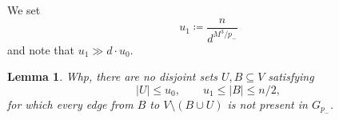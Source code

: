 \documentclass[notitlepage]{scrartcl}
\newtheorem{lemma}[thm]{Lemma}
\begin{document}


We set
\begin{equation*}
 u_1\coloneqq \frac{n}{d^{M^3/p_-}}
\end{equation*}
and note that $u_1 \gg d\cdot u_0$.


\begin{lemma}\label{lem:no-small-separator}
Whp, there are no disjoint sets $U, B\subseteq V$ satisfying
\[
 |U|\le u_0, \qquad u_1\le|B|\le n/2,
\]
for which every edge from $B$ to $V\setminus(B\cup U)$ is not present in $G_{p_-}$.
\end{lemma}
\end{document}
